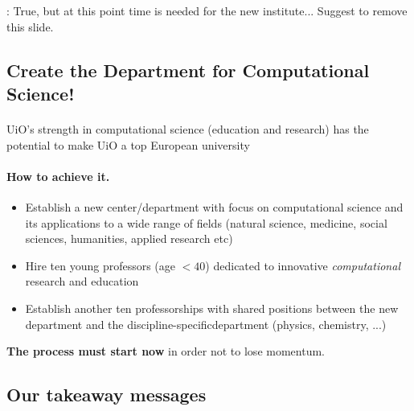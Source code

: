 \documentclass[%
oneside,                 %
final,                   %
10pt]{article}
\newcommand{\shortinlinecomment}[3]{{\color{red}{\bf #1}: #2}}
\begin{document}
\shortinlinecomment{hpl 3}{ True, but at this point time is needed for the new institute... Suggest to remove this slide. }{ True, but at this }

\subsection{Create the Department for Computational Science!}


\paragraph{}
UiO's strength in computational science (education and research)
has the potential to make UiO a top European university




\paragraph{How to achieve it.}
\begin{itemize}
\item Establish  a new center/department with focus on computational science and its applications to a wide range of fields (natural science, medicine, social sciences, humanities, applied research etc)

\item Hire ten young professors (age $< 40$) dedicated to innovative \emph{computational} research and education

\item Establish another ten professorships with  shared positions between the  new department and the discipline-specificdepartment (physics, chemistry, ...)
\end{itemize}

\noindent



\textbf{The process must start now} in order not to lose momentum.



\subsection{Our takeaway messages}

\end{document}
